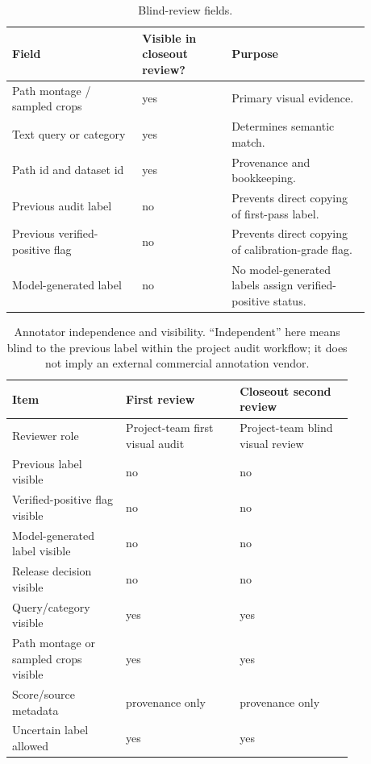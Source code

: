 \documentclass[11pt]{article}
\begin{document}
\begin{table}[h]
\centering
\caption{Blind-review fields.}
\small
\begin{tabular}{p{0.32\linewidth}p{0.22\linewidth}p{0.34\linewidth}}
\toprule
Field & Visible in closeout review? & Purpose \\
\midrule
Path montage / sampled crops & yes & Primary visual evidence. \\
Text query or category & yes & Determines semantic match. \\
Path id and dataset id & yes & Provenance and bookkeeping. \\
Previous audit label & no & Prevents direct copying of first-pass label. \\
Previous verified-positive flag & no & Prevents direct copying of calibration-grade flag. \\
Model-generated label & no & No model-generated labels assign verified-positive status. \\
\bottomrule
\end{tabular}
\end{table}

\begin{table}[h]
\centering
\caption{Annotator independence and visibility. ``Independent'' here means blind to the previous label within the project audit workflow; it does not imply an external commercial annotation vendor.}
\small
\begin{tabular}{p{0.28\linewidth}p{0.28\linewidth}p{0.28\linewidth}}
\toprule
Item & First review & Closeout second review \\
\midrule
Reviewer role & Project-team first visual audit & Project-team blind visual review \\
Previous label visible & no & no \\
Verified-positive flag visible & no & no \\
Model-generated label visible & no & no \\
Release decision visible & no & no \\
Query/category visible & yes & yes \\
Path montage or sampled crops visible & yes & yes \\
Score/source metadata & provenance only & provenance only \\
Uncertain label allowed & yes & yes \\
\bottomrule
\end{tabular}
\end{table}
\end{document}
